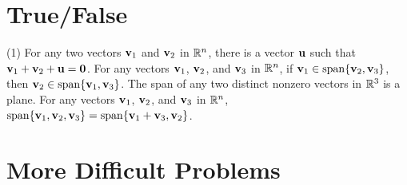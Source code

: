 \section{True/False}
\trueFalseHeader
\begin{tasks}[resume, style=enumerate](1)
\task
  For any two vectors $\mathbf v_1$ and $\mathbf v_2$ in $\mathbb R^n$, there is a
  vector $\mathbf u$ such that $\mathbf v_1 + \mathbf v_2 + \mathbf u =
  \mathbf 0$.
\task
  For any vectors $\mathbf v_1$, $\mathbf v_2$, and $\mathbf v_3$ in $\mathbb R^n$, if $\mathbf v_1
  \in \operatorname{\mathrm{span}}\{\mathbf v_2, \mathbf v_3\}$, then $\mathbf v_2 \in \operatorname{\mathrm{span}}\{\mathbf v_1,
  \mathbf v_3\}$.
\task
  The span of any two distinct nonzero vectors in $\mathbb R^3$ is a plane.
\task
  For any vectors $\mathbf v_1$, $\mathbf v_2$, and $\mathbf v_3$ in $\mathbb R^n$,
  $\operatorname{\mathrm{span}}\{\mathbf v_1, \mathbf v_2, \mathbf v_3\} = \operatorname{\mathrm{span}}\{\mathbf v_1 + \mathbf v_3, \mathbf v_2\}$.
\end{tasks}

\section{More Difficult Problems}

